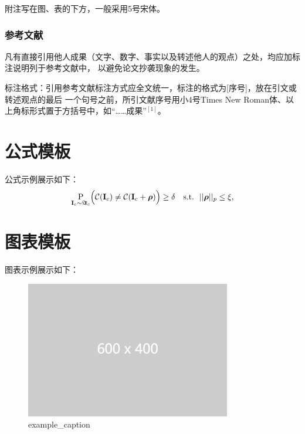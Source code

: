 \documentclass[zihao=-4]{ctexart}
\begin{document}
\begin{spacing}{1.5}
附注写在图、表的下方，一般采用5号宋体。

\subsubsection{参考文献}
凡有直接引用他人成果（文字、数字、事实以及转述他人的观点）之处，均应加标注说明列于参考文献中，
以避免论文抄袭现象的发生。

标注格式：引用参考文献标注方式应全文统一，标注的格式为[序号]，放在引文或转述观点的最后
一个句号之前，所引文献序号用小4号Times New Roman体、以上角标形式置于方括号中，如“……成果”$^{[1]}$。
\section{公式模板}

公式示例展示如下：
\begin{align}
\underset{{\bf I}_c \sim \boldsymbol\Im_c}{\mathrm{\text P}} \Big( \mathcal C({\bf I}_c) \neq \mathcal C({\bf I}_c + \boldsymbol \rho) \Big) \geq \delta ~~~\text{s.t.}~~||\boldsymbol\rho||_p \leq \xi,
\label{eq:def1}
\end{align}

\section{图表模板}
图表示例展示如下：

\begin{figure}[H] %
    \centering %
    \includegraphics[width=0.8\textwidth]{example-image-2.png} %
    \caption{example\_caption} %
    \label{example_label} %
\end{figure}


\end{spacing}
\end{document}

